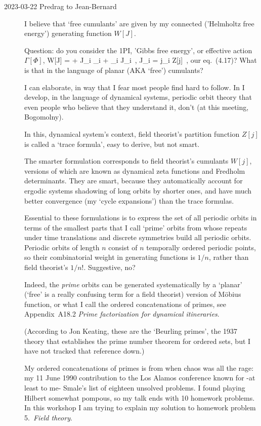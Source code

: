 \begin{description}
   \item[2023-03-22 Predrag to Jean-Bernard] I believe that `free
       cumulants' are given by my connected ('Helmholtz free energy')
       generating function $W[J]$.

Question: do you consider the 1PI, 'Gibbs free energy', or
effective action $\Gamma[\Phi]$,
\beq
 W[J] = \Gamma[\Phi] +  J_i \Phi_i + \Phi_i J_i
\,,\qquad
 J_i = j_i Z[j]
\,,
our  eq.~(4.17)? What is that in the language of planar
(AKA `free') cumulants?

I can elaborate, in way that I fear most people find hard to follow. In
\wwwcb{} I develop, in the language of dynamical systems, periodic orbit
theory that even people who believe that they understand it, don't (at
this meeting, Bogomolny).

In this, dynamical system's context, field theorist's
partition function $Z[j]$ is called a `trace formula', easy to derive,
but not smart.

The smarter formulation corresponds to field theorist's cumulants $W[j]$,
versions of which are known as dynamical zeta functions and Fredholm
determinants. They are smart, because they automatically account for
ergodic systems shadowing of long orbits by shorter ones, and have much
better convergence (my `cycle expansions') than the trace formulas.

Essential to these formulations is to express the set of all periodic
orbits in terms of the smallest parts that I call `prime' orbits from
whose repeats under time translations and discrete symmetries build all
periodic orbits. Periodic orbits of length $n$ consist of $n$  temporally
ordered periodic points, so their combinatorial weight in generating
functions is $1/n$, rather than field theorist's $1/n!$. Suggestive, no?

Indeed, the \emph{prime} orbits can be generated systematically by a
`planar' (`free' is a really confusing term for a field theorist) version
of M{\"o}bius function, or what I call the ordered
concatenations of primes, see
 {Appendix~A18.2}
{{\em Prime factorization for dynamical itineraries}}.

(According to Jon Keating, these are the `Beurling primes', the 1937
theory that establishes the prime number theorem for ordered sets, but I
have not tracked that reference down.)

My ordered concatenations of primes is from when chaos was all the rage:
my 11 June 1990 contribution to the Los Alamos conference known for -at
least to me- Smale's list of
{eighteen unsolved problems}. I found playing Hilbert somewhat pompous,
so my talk ends with 10 homework problems.
In this workshop I am trying to explain my solution to homework problem
5.~\emph{Field theory}.


\end{description}
